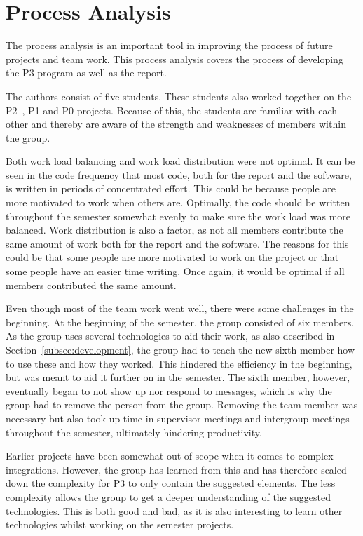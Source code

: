 \section{Process Analysis}\label{sec:process-analysis}

The process analysis is an important tool in improving the process of future projects and team work.
This process analysis covers the process of developing the P3 program as well as the report.

The authors consist of five students.
These students also worked together on the P2~\cite{P2}, P1 and P0 projects.
Because of this, the students are familiar with each other and thereby are aware of the strength and weaknesses of
members within the group.

Both work load balancing and work load distribution were not optimal.
It can be seen in the code frequency that most code, both for the report and the software, is written in periods of
concentrated effort.
This could be because people are more motivated to work when others are.
Optimally, the code should be written throughout the semester somewhat evenly to make sure the work load was more
balanced.
Work distribution is also a factor, as not all members contribute the same amount of work both for the report and the
software.
The reasons for this could be that some people are more motivated to work on the project or that some people have an
easier time writing.
Once again, it would be optimal if all members contributed the same amount.

Even though most of the team work went well, there were some challenges in the beginning.
At the beginning of the semester, the group consisted of six members.
As the group uses several technologies to aid their work, as also described in Section~\ref{subsec:development}, the
group had to teach the new sixth member how to use these and how they worked.
This hindered the efficiency in the beginning, but was meant to aid it further on in the semester.
The sixth member, however, eventually began to not show up nor respond to messages, which is why the group had to remove
the person from the group.
Removing the team member was necessary but also took up time in supervisor meetings and intergroup meetings throughout
the semester, ultimately hindering productivity.

Earlier projects have been somewhat out of scope when it comes to complex integrations.
However, the group has learned from this and has therefore scaled down the complexity for P3 to only contain the
suggested elements.
The less complexity allows the group to get a deeper understanding of the suggested technologies.
This is both good and bad, as it is also interesting to learn other technologies whilst working on the semester
projects.

